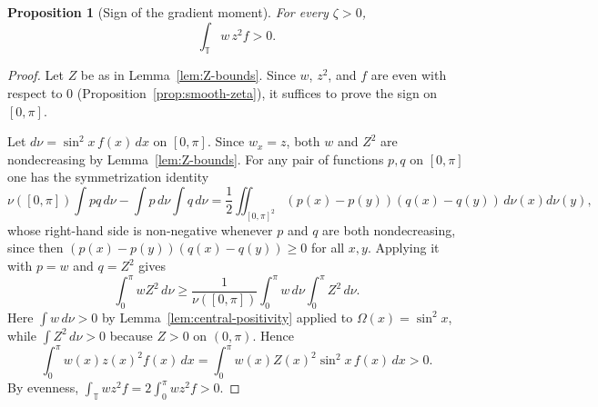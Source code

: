 \documentclass{amsart}
\newtheorem{proposition}[theorem]{Proposition}
\newcommand{\T}{\mathbb T}
\begin{document}
\begin{proposition}[Sign of the gradient moment]\label{prop:gradient}
For every $\zeta>0$,
\[
\int_\T w\,z^2 f> 0.
\]
\end{proposition}
\begin{proof}
Let $Z$ be as in Lemma~\ref{lem:Z-bounds}. Since $w$, $z^2$, and $f$
are even with respect to $0$ (Proposition~\ref{prop:smooth-zeta}), it suffices
to prove the sign on $[0,\pi]$.

Let $d\nu=\sin^2x\,f(x)\,dx$ on $[0,\pi]$. Since $w_x=z$, both $w$
and $Z^2$ are nondecreasing by Lemma~\ref{lem:Z-bounds}. For any pair
of functions $p,q$ on $[0,\pi]$ one has the symmetrization identity
\[
\nu([0,\pi])\int pq\,d\nu-\int p\,d\nu\int q\,d\nu
=\frac12\iint_{[0,\pi]^2}(p(x)-p(y))(q(x)-q(y))\,d\nu(x)d\nu(y),
\]
whose right-hand side is non-negative whenever $p$ and $q$ are both
nondecreasing, since then $(p(x)-p(y))(q(x)-q(y))\geq 0$ for all $x,y$. Applying it with $p=w$ and $q=Z^2$
gives
\[
\int_0^\pi wZ^2\,d\nu
\geq
\frac{1}{\nu([0,\pi])}\int_0^\pi w\,d\nu\int_0^\pi Z^2\,d\nu .
\]
Here $\int w\,d\nu>0$ by Lemma~\ref{lem:central-positivity} applied to
$\Omega(x)=\sin^2 x$, while $\int Z^2\,d\nu>0$ because $Z>0$ on
$(0,\pi)$. Hence
\[
\int_0^\pi w(x)z(x)^2f(x)\,dx
=\int_0^\pi w(x)Z(x)^2\sin^2x\,f(x)\,dx>0.
\]
By evenness, $\int_\T wz^2 f=2\int_0^\pi wz^2 f>0$.
\end{proof}
\end{document}
